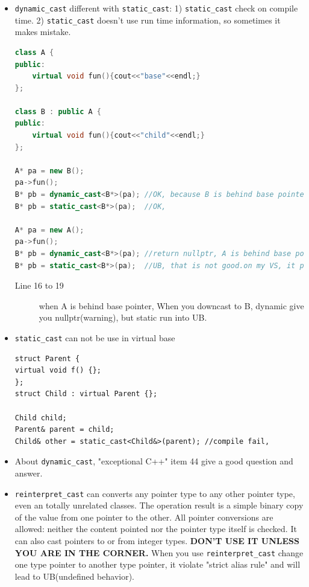 \documentclass[a4paper,11pt,twoside]{book}
\begin{document}
\begin{itemize}
	\item \texttt{dynamic\_cast} different with \texttt{static\_cast}: 1) \texttt{static\_cast} check on compile time. 2) \texttt{static\_cast} doesn't use run time information, so sometimes it makes mistake.
\begin{lstlisting}[frame=single, language=c++, mathescape=true]
class A {
public:
	virtual void fun(){cout<<"base"<<endl;}
};

class B : public A {
public:
	virtual void fun(){cout<<"child"<<endl;}
};

A* pa = new B();
pa->fun();
B* pb = dynamic_cast<B*>(pa); //OK, because B is behind base pointer pa,
B* pb = static_cast<B*>(pa);  //OK, 	

A* pa = new A();
pa->fun();
B* pb = dynamic_cast<B*>(pa); //return nullptr, A is behind base pointer pa, 
B* pb = static_cast<B*>(pa);  //UB, that is not good.on my VS, it print "base"
\end{lstlisting}
\begin{description}
	\item[Line 16 to 19]  when A is behind base pointer, When you downcast to B, dynamic give you nullptr(warning), but static run into UB.	
\end{description}

	\item \texttt{static\_cast} can not be use in virtual base 
\begin{lstlisting}[numbers = none]
struct Parent {
virtual void f() {};
};
struct Child : virtual Parent {};

Child child;
Parent& parent = child;
Child& other = static_cast<Child&>(parent); //compile fail, 
\end{lstlisting}

	\item About \texttt{dynamic\_cast}, "exceptional C++" item 44 give a good question and answer.
	
	\item \texttt{reinterpret\_cast} can converts any pointer type to any other pointer type, even an totally unrelated classes. The operation result is a simple binary copy of the value from one pointer to the other. All pointer conversions are allowed: neither the content pointed nor the pointer type itself is checked. It can also cast pointers to or from integer types. \textbf{DON'T USE IT UNLESS YOU ARE IN THE CORNER.} When you use \texttt{reinterpret\_cast} change one type pointer to another type pointer, it violate "strict alias rule" and will lead to UB(undefined behavior).
	

\end{itemize}
\end{document}
